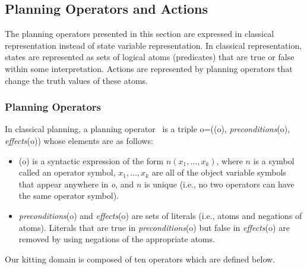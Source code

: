 \subsection{Planning Operators and Actions}
\label{subsect:Planning_Operators}
The planning operators presented in this section are expressed in classical representation instead of state variable representation. In classical representation, states are represented as sets of logical atoms (predicates) that are true or false within some interpretation. Actions are represented by planning operators that change the truth values of these atoms.


\subsubsection{Planning Operators}
 In classical planning, a planning operator~\cite{NAU.2004} is a triple o=((o), \textit{preconditions}(o), \textit{effects}(o)) whose elements are as follows:
\begin{itemize}
\item {}(o) is a syntactic expression of the form $n(x_1,\dots,x_k)$, where $n$ is a symbol
called an operator symbol, $x_1,\dots,x_k$ are all of the object variable symbols that
appear anywhere in \textit{o}, and $n$ is unique (i.e., no two operators can have the
same operator symbol).
\item \textit{preconditions}(o) and \textit{effects}(o) are sets of literals (i.e., atoms and negations of atoms). Literals that are true in \textit{preconditions}(o) but false in \textit{effects}(o) are removed by using negations of the appropriate atoms.
\end{itemize}

Our kitting domain is composed of ten operators which are defined below.


